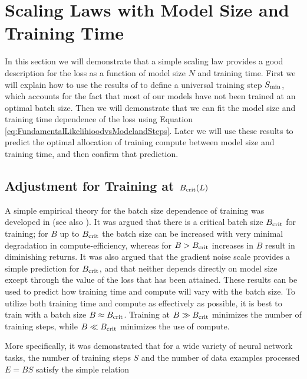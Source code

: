 \section{Scaling Laws with Model Size and Training Time}
\label{sec:ScalingSizeandSteps}

In this section we will demonstrate that a simple scaling law provides a good description for the loss as a function of model size $N$ and training time.  First we will explain how to use the results of \cite{1812.06162}  to define a universal training step $S_{\rm min}$, which accounts for the fact that most of our models have not been trained at an optimal batch size.   Then we will demonstrate that we can fit the model size and training time dependence of the loss using Equation \eqref{eq:FundamentalLikelihioodvsModelandSteps}.  Later we will use these results to predict the optimal allocation of training compute between model size and training time, and then confirm that prediction.

\subsection{Adjustment for Training at $B_{\rm crit}(L)$}
\label{sec:OptimalBatchSize}

A simple empirical theory for the batch size dependence of training was developed in \cite{1812.06162} (see also \cite{1811.03600, DBLP:journals/corr/abs-1907-04164}).  It was argued that there is a critical batch size $B_{\rm crit}$ for training; for $B$ up to $B_{\rm crit}$  the batch size can be increased with very minimal degradation in compute-efficiency, whereas for $B > B_{\rm crit}$ increases in $B$ result in diminishing returns.  It was also argued that the gradient noise scale provides a simple prediction for $B_{\rm crit}$, and that neither depends directly on model size except through the value of the loss that has been attained.  These results can be used to predict how training time and compute will vary with the batch size.  To utilize both training time and compute as effectively as possible, it is best to train with a batch size $B \approx B_{\rm crit}$.  Training at $B \gg B_{\rm crit}$  minimizes the number of training steps, while $B \ll B_{\rm crit}$ minimizes the use of compute.

More specifically, it was demonstrated that for a wide variety of neural network tasks, the number of training steps $S$ and the number of data examples processed $E = B S$ satisfy the simple relation


